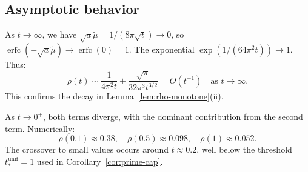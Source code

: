 \documentclass[11pt,a4paper]{article}
\theoremstyle{definition}
\theoremstyle{remark}
\DeclareMathOperator{\erfc}{erfc}
\begin{document}
\subsection{Asymptotic behavior}

As $t \to \infty$, we have $\sqrt{a}\tilde{\mu} = 1/(8\pi\sqrt{t}) \to 0$, so $\erfc(-\sqrt{a}\tilde{\mu}) \to \erfc(0) = 1$. The exponential $\exp(1/(64\pi^2 t)) \to 1$. Thus:
\[
  \rho(t) \sim \frac{1}{4\pi^2 t} + \frac{\sqrt{\pi}}{32\pi^3 t^{3/2}} = O(t^{-1}) \quad \text{as } t \to \infty.
\]
This confirms the decay in Lemma~\ref{lem:rho-monotone}(ii).

As $t \to 0^+$, both terms diverge, with the dominant contribution from the second term. Numerically:
\[
  \rho(0.1) \approx 0.38, \quad \rho(0.5) \approx 0.098, \quad \rho(1) \approx 0.052.
\]
The crossover to small values occurs around $t \approx 0.2$, well below the threshold $t_*^{\mathrm{unif}} = 1$ used in Corollary~\ref{cor:prime-cap}.
\end{document}
